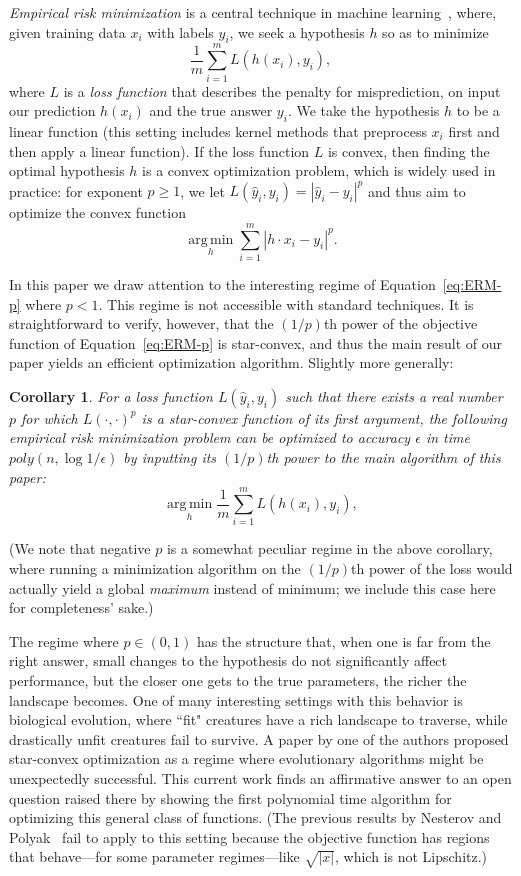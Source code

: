 \documentclass[11pt,letter]{article}
\newcommand{\argmin}{\operatorname*{\mathrm{arg\,min}}}
\newcounter{nTheorems}
\numberwithin{nTheorems}{section}
\newtheorem{corollary}[nTheorems]{Corollary}
\begin{document}
\emph{Empirical risk minimization} is a central technique in machine learning~\cite{Vapnik:2013}, where, given training data $x_i$ with labels $y_i$, we seek a hypothesis $h$ so as to minimize \[\frac{1}{m}\sum_{i=1}^m L(h(x_i),y_i),\] where $L$ is a \emph{loss function} that describes the penalty for misprediction, on input our prediction $h(x_i)$ and the true answer $y_i$. We take the hypothesis $h$ to be a linear function (this setting includes kernel methods that preprocess $x_i$ first and then apply a linear function). If the loss function $L$ is convex, then finding the optimal hypothesis $h$ is a convex optimization problem, which is widely used in practice: for exponent $p\geq 1$, we let $L(\hat{y}_i,y_i)=|\hat{y}_i-y_i|^p$ and thus aim to optimize the convex function \begin{equation}\label{eq:ERM-p}\argmin_{h}\sum_{i=1}^m |h\cdot x_i - y_i|^p.\end{equation}

In this paper we draw attention to the interesting regime of Equation~\ref{eq:ERM-p} where $p<1$. This regime is not accessible with standard techniques. It is straightforward to verify, however, that the $(1/p)$th power of the objective function of Equation~\ref{eq:ERM-p} is star-convex, and thus the main result of our paper yields an efficient optimization algorithm. Slightly more generally:

\begin{corollary}
  For a loss function $L(\hat{y}_i,y_i)$ such that there exists a real number $p$ for which $L(\cdot,\cdot)^p$ is a star-convex function of its first argument, the following empirical risk minimization problem can be optimized to accuracy $\epsilon$ in time $poly(n,\log 1/\epsilon)$ by inputting its $(1/p)$th power to the main algorithm of this paper:
  \[\argmin_{h}\frac{1}{m}\sum_{i=1}^m L(h(x_i),y_i),\]
\end{corollary}

(We note that negative $p$ is a somewhat peculiar regime in the above corollary, where running a minimization algorithm on the $(1/p)$th power of the loss would actually yield a global \emph{maximum} instead of minimum; we include this case here for completeness' sake.)

The regime where $p\in (0,1)$ has the structure that, when one is far from the right answer, small changes to the hypothesis do not significantly affect performance, but the closer one gets to the true parameters, the richer the landscape becomes. One of many interesting settings with this behavior is biological evolution, where ``fit" creatures have a rich landscape to traverse, while drastically unfit creatures fail to survive. A paper by one of the authors proposed star-convex optimization as a regime where evolutionary algorithms might be unexpectedly successful. This current work finds an affirmative answer to an open question raised there by showing the first polynomial time algorithm for optimizing this general class of functions. (The previous results by Nesterov and Polyak~\cite{Nesterov:2006} fail to apply to this setting because the objective function has regions that behave---for some parameter regimes---like $\sqrt{|x|}$, which is not Lipschitz.)
\end{document}
